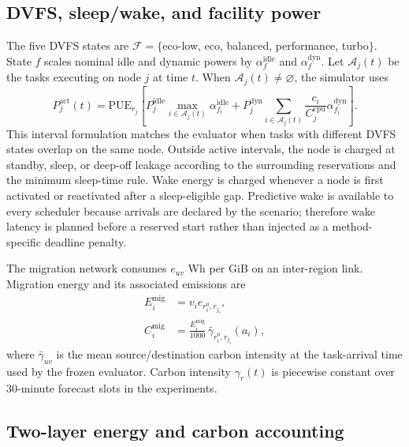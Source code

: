 \subsection{DVFS, sleep/wake, and facility power}

The five DVFS states are $\mathcal{F}=\{$eco-low, eco, balanced, performance, turbo$\}$. State $f$ scales nominal idle and dynamic powers by $\alpha_f^{\mathrm{idle}}$ and $\alpha_f^{\mathrm{dyn}}$. Let $\mathcal{A}_j(t)$ be the tasks executing on node $j$ at time $t$. When $\mathcal{A}_j(t)\neq\varnothing$, the simulator uses
\begin{equation}
P_j^{\mathrm{act}}(t)=\mathrm{PUE}_{r_j}\!\left[
P_j^{\mathrm{idle}}\max_{i\in\mathcal{A}_j(t)}\alpha_{f_i}^{\mathrm{idle}}
+P_j^{\mathrm{dyn}}\sum_{i\in\mathcal{A}_j(t)}
\frac{c_i}{C_j^{\mathrm{cpu}}}\alpha_{f_i}^{\mathrm{dyn}}
\right].
\label{eq:active-power}
\end{equation}
This interval formulation matches the evaluator when tasks with different DVFS states overlap on the same node. Outside active intervals, the node is charged at standby, sleep, or deep-off leakage according to the surrounding reservations and the minimum sleep-time rule. Wake energy is charged whenever a node is first activated or reactivated after a sleep-eligible gap. Predictive wake is available to every scheduler because arrivals are declared by the scenario; therefore wake latency is planned before a reserved start rather than injected as a method-specific deadline penalty.

The migration network consumes $e_{uv}$ Wh per GiB on an inter-region link. Migration energy and its associated emissions are
\begin{align}
E_i^{\mathrm{mig}} &= v_i e_{r_i^0,r_{j_i}}, \\
C_i^{\mathrm{mig}} &= \frac{E_i^{\mathrm{mig}}}{1000}\,\bar{\gamma}_{r_i^0,r_{j_i}}(a_i),
\label{eq:migration-energy}
\end{align}
where $\bar{\gamma}_{uv}$ is the mean source/destination carbon intensity at the task-arrival time used by the frozen evaluator. Carbon intensity $\gamma_r(t)$ is piecewise constant over 30-minute forecast slots in the experiments.

\subsection{Two-layer energy and carbon accounting}
\label{sec:two-layer}

